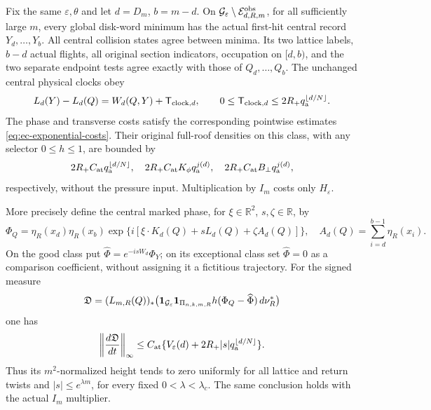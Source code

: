 \begin{theorem}
\label{thm:nh-records}
Fix the same $\varepsilon,\theta$ and let $d=D_m$, $b=m-d$.
On $\mathcal G_\varepsilon\setminus\mathcal E^{\rm obs}_{d,R,m}$,
for all sufficiently large $m$, every global disk-word minimum
has the actual first-hit central record $Y_d,\ldots,Y_b$.
All central collision states agree between minima.  Its two
lattice labels, $b-d$ actual flights, all original section
indicators, occupation on $[d,b)$, and the two separate endpoint
tests agree exactly with those of $Q_d,\ldots,Q_b$.
The unchanged central physical clocks obey
\begin{equation}\label{eq:nh-clock}
 L_d(Y)-L_d(Q)=W_d(Q,Y)+\mathsf T_{{\rm clock},d},\qquad
 0\le\mathsf T_{{\rm clock},d}
                 \le2R_+q_{\rm a}^{\lfloor d/N\rfloor}.
\end{equation}
The phase and transverse costs satisfy the corresponding pointwise
estimates \eqref{eq:ec-exponential-costs}.
Their original full-roof densities on this class, with any
selector $0\le h\le1$, are bounded by
\begin{equation}\label{eq:nh-costs}
 2R_+ C_{\rm at}q_{\rm a}^{\lfloor d/N\rfloor},\quad
 2R_+ C_{\rm at}K_\phi q_{\rm a}^{j(d)},\quad
 2R_+ C_{\rm at}B_\perp q_{\rm a}^{j(d)},
\end{equation}
respectively, without the pressure input.  Multiplication by
$I_m$ costs only $H_\varepsilon$.

More precisely define the central marked phase, for
$\xi\in\mathbb R^2$, $s,\zeta\in\mathbb R$, by
\[
 \Phi_Q=
 \eta_R(x_d)\eta_R(x_b)
 \exp\{i[\xi\cdot K_d(Q)+sL_d(Q)+\zeta A_d(Q)]\},
 \quad A_d(Q)=\sum_{i=d}^{b-1}\eta_R(x_i).
\]
On the good class put $\widehat\Phi=e^{-isW_d}\Phi_Y$;
on its exceptional class set $\widehat\Phi=0$ as a comparison
coefficient, without assigning it a fictitious trajectory.
For the signed measure
\[
 \mathfrak D=(L_{m,R}(Q))_*
  \bigl(\mathbf1_{\mathcal G_\varepsilon}\mathbf1_{\Pi_{n,k,m,R}}
                  h(\Phi_Q-\widehat\Phi)\,d\nu_R^*\bigr)
\]
one has
\begin{equation}\label{eq:nh-fourier}
 \left\|\frac{d\mathfrak D}{dt}\right\|_\infty
 \le C_{\rm at}
       \{V_\varepsilon(d)+2R_+|s|q_{\rm a}^{\lfloor d/N\rfloor}\}.
\end{equation}
Thus its $m^2$-normalized height tends to zero uniformly for
all lattice and return twists and $|s|\le e^{\lambda m}$,
for every fixed $0<\lambda<\lambda_c$.  The same conclusion
holds with the actual $I_m$ multiplier.
\end{theorem}
